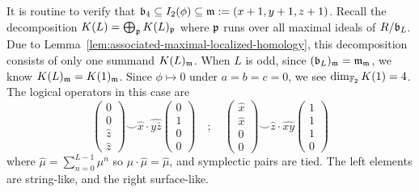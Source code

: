 \begin{example}
It is routine to verify that $\mathfrak{b}_4 \subseteq I_2(\phi) \subseteq \mathfrak{m} := (x+1,y+1,z+1)$.
Recall the decomposition $K(L) = \bigoplus_{\mathfrak{p}} K(L)_{\mathfrak{p}}$ where $\mathfrak{p}$ runs over all maximal ideals of $R/\mathfrak{b}_L$.
Due to Lemma~\ref{lem:associated-maximal-localized-homology}, this decomposition consists of only one summand $K(L)_{\mathfrak{m}}$.
When $L$ is odd, since $(\mathfrak{b}_L)_{\mathfrak{m}} = \mathfrak{m}_{\mathfrak{m}}$, we know $K(L)_{\mathfrak{m}} = K(1)_{\mathfrak{m}}$.
Since $\phi \mapsto 0$ under $a=b=c=0$, we see $\dim_{\mathbb{F}_2} K(1) = 4$.
The logical operators in this case are
\[
 \begin{pmatrix}  0 \\ 0 \\ \widehat z  \\ \widehat z  \end{pmatrix}
\smile
 \widehat x \cdot \widehat{y \bar z}
 \begin{pmatrix}  0 \\ 1 \\ 0 \\ 0 \end{pmatrix}
%
 \quad ; \quad
%
 \begin{pmatrix}  \widehat x \\ \widehat x \\ 0 \\ 0 \end{pmatrix}
\smile
 \widehat z \cdot \widehat{x y} 
 \begin{pmatrix}  1 \\ 1 \\ 1 \\ 0 \end{pmatrix}
\]
where $\widehat \mu = \sum_{n=0}^{L-1} \mu^n$ so $\mu \cdot \widehat \mu = \widehat \mu$,
and symplectic pairs are tied.
The left elements are string-like, and the right surface-like.


\end{example}
